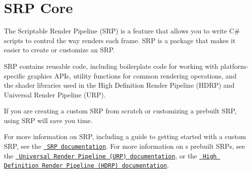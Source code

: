 \chapter{SRP Core}
\hypertarget{md__hey_tea_9_2_library_2_package_cache_2com_8unity_8render-pipelines_8core_0d14_80_88_2_documentation_0i_2index}{}\label{md__hey_tea_9_2_library_2_package_cache_2com_8unity_8render-pipelines_8core_0d14_80_88_2_documentation_0i_2index}
\label{md__hey_tea_9_2_library_2_package_cache_2com_8unity_8render-pipelines_8core_0d14_80_88_2_documentation_0i_2index_autotoc_md1793}%
%
 

The Scriptable Render Pipeline (SRP) is a  feature that allows you to write C\# scripts to control the way  renders each frame. SRP  is a package that makes it easier to create or customize an SRP.

SRP  contains reusable code, including boilerplate code for working with platform-\/specific graphics APIs, utility functions for common rendering operations, and the shader libraries used in the High Definition Render Pipeline (HDRP) and Universal Render Pipeline (URP).

If you are creating a custom SRP from scratch or customizing a prebuilt SRP, using SRP  will save you time.

For more information on SRP, including a guide to getting started with a custom SRP, see the \href{https://docs.unity3d.com/Manual/ScriptableRenderPipeline.html}{\texttt{ SRP documentation}}. For more information on \textquotesingle{}s prebuilt SRPs, see the \href{https://docs.unity3d.com/Packages/com.unity.render-pipelines.universal@latest}{\texttt{ Universal Render Pipeline (URP) documentation}}, or the \href{https://docs.unity3d.com/Packages/com.unity.render-pipelines.high-definition@latest}{\texttt{ High Definition Render Pipeline (HDRP) documentation}}. 
